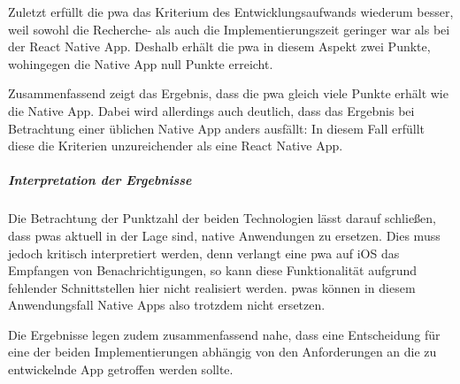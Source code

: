Zuletzt erfüllt die \ac{pwa} das Kriterium des Entwicklungsaufwands wiederum besser, weil sowohl die Recherche- als auch die Implementierungszeit geringer war als bei der React Native App.
Deshalb erhält die \ac{pwa} in diesem Aspekt zwei Punkte, wohingegen die Native App null Punkte erreicht.

Zusammenfassend zeigt das Ergebnis, dass die \ac{pwa} gleich viele Punkte erhält wie die Native App.
Dabei wird allerdings auch deutlich, dass das Ergebnis bei Betrachtung einer üblichen Native App anders ausfällt: In diesem Fall erfüllt diese die Kriterien unzureichender als eine React Native App.

\subparagraph{Interpretation der Ergebnisse\\}
Die Betrachtung der Punktzahl der beiden Technologien lässt darauf schließen, dass \acp{pwa} aktuell in der Lage sind, native Anwendungen zu ersetzen.
Dies muss jedoch kritisch interpretiert werden, denn verlangt eine \ac{pwa} auf iOS das Empfangen von Benachrichtigungen, so kann diese Funktionalität aufgrund fehlender Schnittstellen hier nicht realisiert werden.
\acp{pwa} können in diesem Anwendungsfall Native Apps also trotzdem nicht ersetzen.

Die Ergebnisse legen zudem zusammenfassend nahe, dass eine Entscheidung für eine der beiden Implementierungen abhängig von den Anforderungen an die zu entwickelnde App getroffen werden sollte.